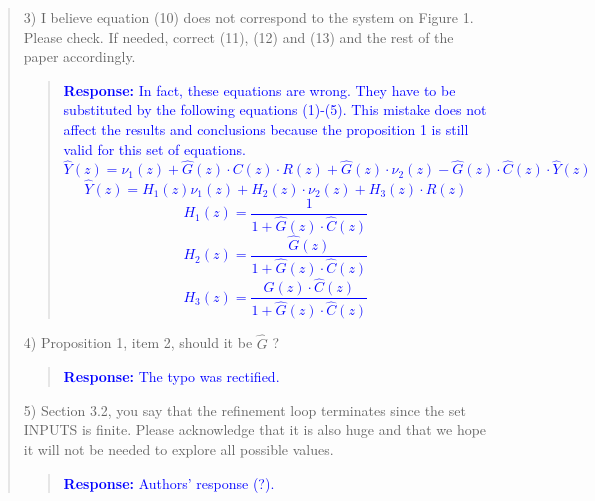 \documentclass[11pt]{article}
\begin{document}
\begin{quote}
3) I believe equation (10) does not correspond to the system on Figure 1. Please check. If needed, correct (11), (12) and (13) and the rest of the paper accordingly.
\begin{quote}
\textcolor{blue}{\textbf{Response:}
In fact, these equations are wrong. They have to be substituted by the following equations (1)-(5). This mistake does not affect the results and conclusions because the proposition 1 is still valid for this set of equations.
\begin{equation}
\hat{Y}(z)=\nu_{1}(z)+\hat{G}(z)\cdot C(z)\cdot R(z)+\hat{G}(z)\cdot\nu_{2}(z)-\hat{G}(z)\cdot \hat{C}(z)\cdot \hat{Y}(z)
\end{equation}
%
\begin{equation}
\hat{Y}(z)=H_{1}(z)\nu_{1}(z)+H_{2}(z)\cdot\nu_{2}(z)+H_{3}(z)\cdot R(z)
\end{equation}
%
\begin{equation}
H_{1}(z)=\frac{1}{1+\hat{G}(z)\cdot \hat{C}(z)}
\end{equation}
\begin{equation}
H_{2}(z)=\frac{\hat{G}(z)}{1+\hat{G}(z)\cdot \hat{C}(z)}
\end{equation}
\begin{equation}
H_{3}(z)=\frac{\hat{G}(z)\cdot \hat{C}(z)}{1+\hat{G}(z)\cdot \hat{C}(z)}
\end{equation}
}
\end{quote}


4) Proposition 1, item 2, should it be $\hat G$ ?
\begin{quote}
\textcolor{blue}{\textbf{Response:} The typo was rectified.}
\end{quote}

5) Section 3.2, you say that the refinement loop terminates since the set INPUTS is finite. Please acknowledge that it is also huge and that we hope it will not be needed to explore all possible values.
\begin{quote}
\textcolor{blue}{\textbf{Response:} Authors' response (?).}
\end{quote}



\end{quote}
\end{document}
